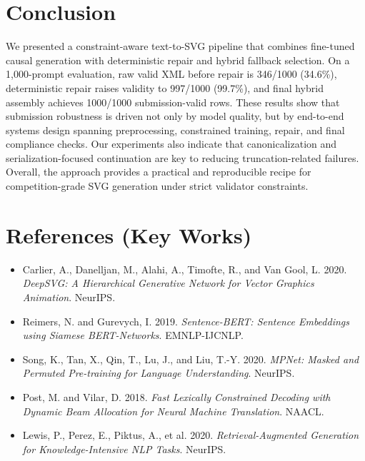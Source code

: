 \documentclass[11pt]{article}
\begin{document}
\section{Conclusion}
We presented a constraint-aware text-to-SVG pipeline that combines fine-tuned causal generation with deterministic repair and hybrid fallback selection.
On a 1,000-prompt evaluation, raw valid XML before repair is 346/1000 (34.6\%), deterministic repair raises validity to 997/1000 (99.7\%), and final hybrid assembly achieves 1000/1000 submission-valid rows.
These results show that submission robustness is driven not only by model quality, but by end-to-end systems design spanning preprocessing, constrained training, repair, and final compliance checks.
Our experiments also indicate that canonicalization and serialization-focused continuation are key to reducing truncation-related failures.
Overall, the approach provides a practical and reproducible recipe for competition-grade SVG generation under strict validator constraints.

\section*{References (Key Works)}
\begin{itemize}
    \item Carlier, A., Danelljan, M., Alahi, A., Timofte, R., and Van Gool, L. 2020. \textit{DeepSVG: A Hierarchical Generative Network for Vector Graphics Animation}. NeurIPS.
    \item Reimers, N. and Gurevych, I. 2019. \textit{Sentence-BERT: Sentence Embeddings using Siamese BERT-Networks}. EMNLP-IJCNLP.
    \item Song, K., Tan, X., Qin, T., Lu, J., and Liu, T.-Y. 2020. \textit{MPNet: Masked and Permuted Pre-training for Language Understanding}. NeurIPS.
    \item Post, M. and Vilar, D. 2018. \textit{Fast Lexically Constrained Decoding with Dynamic Beam Allocation for Neural Machine Translation}. NAACL.
    \item Lewis, P., Perez, E., Piktus, A., et al. 2020. \textit{Retrieval-Augmented Generation for Knowledge-Intensive NLP Tasks}. NeurIPS.
\end{itemize}


\end{document}
